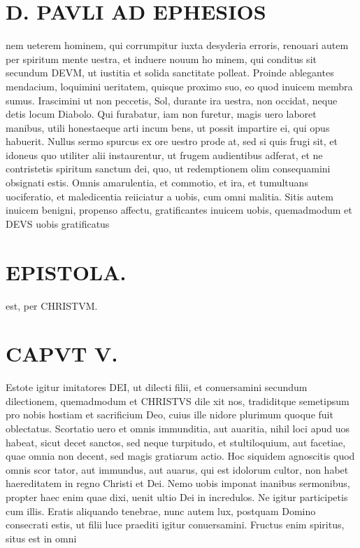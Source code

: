 \documentclass{article}
\begin{document}
\begin{pages}
\section*{D. PAVLI AD EPHESIOS }
\marginpar{[ p.8. ]}
\marginpar{[ p.9.  ]}
\marginpar{[ p.10.  ]}
\marginpar{[ p.11.  ]}
\marginpar{[ p.12.  ]}
\marginpar{[ p.13.  ]}\pstart nem ueterem hominem, qui corrumpitur iuxta desyderia erroris, renouari autem per spiritum mente uestra, et induere nouum ho minem, qui conditus sit secundum DEVM, ut iustitia et solida sanctitate polleat.  \pend\pstart Proinde ablegantes mendacium, loquimini ueritatem, quisque proximo suo, eo quod inuicem membra sumus.  \pend\pstart Irascimini ut non peccetis, Sol, durante ira uestra, non occidat, neque detis locum Diabolo.  \pend\pstart Qui furabatur, iam non furetur, magis uero laboret manibus, utili honestaeque  arti incum bens, ut possit impartire ei, qui opus habuerit.  \pend\pstart Nullus sermo spurcus ex ore uestro prode at, sed si quis frugi sit, et idoneus quo utiliter alii instaurentur, ut frugem audientibus adferat, et ne contristetis spiritum sanctum dei, quo, ut redemptionem olim consequamini obsignati estis.  \pend\pstart Omnis amarulentia, et commotio, et ira, et tumultuans uociferatio, et maledicentia reiiciatur a uobis, cum omni malitia.  \pend\pstart Sitis autem inuicem benigni, propenso affectu, gratificantes inuicem uobis, quemadmodum et DEVS uobis gratificatus  \pend
\section*{EPISTOLA.  }
\marginpar{[ p.14 ]}
\marginpar{[ p.1.  ]}
\marginpar{[ p.2.  ]}
\marginpar{[ p.3.  ]}
\marginpar{[ p.4.  ]}
\marginpar{[ p.5.  ]}\pstart est, per CHRISTVM.   \pend
\endnumbering\beginnumbering\section{CAPVT V. }\pstart Estote igitur imitatores DEI, ut dilecti filii, et conuersamini secundum dilectionem, quemadmodum et CHRISTVS dile xit nos, tradiditque  semetipsum pro nobis hostiam et sacrificium Deo, cuius ille nidore plurimum quoque  fuit oblectatus.  \pend\pstart Scortatio uero et omnis immunditia, aut auaritia, nihil loci apud uos habeat, sicut decet sanctos, sed neque turpitudo, et stultiloquium, aut facetiae, quae omnia non decent, sed magis gratiarum actio.  \pend\pstart Hoc siquidem agnoscitis quod omnis scor tator, aut immundus, aut auarus, qui est idolorum cultor, non habet haereditatem in regno Christi et Dei. Nemo uobis imponat inanibus sermonibus, propter haec enim quae dixi, uenit ultio Dei in incredulos.  \pend\pstart Ne igitur participetis cum illis. Eratis aliquando tenebrae, nunc autem lux, postquam Domino consecrati estis, ut filii luce praediti igitur conuersamini.  \pend\pstart Fructus enim spiritus, situs est in omni  \pend

\end{pages}
\end{document}
